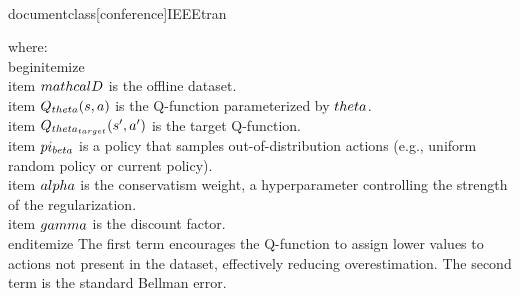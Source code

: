 \\documentclass[conference]{IEEEtran}
\begin{document}
where:
\\begin{itemize}
    \\item $\\mathcal{D}$ is the offline dataset.
    \\item $Q_{\\theta}(s,a)$ is the Q-function parameterized by $\\theta$.
    \\item $Q_{\\theta_{target}}(s',a')$ is the target Q-function.
    \\item $\\pi_{\\beta}$ is a policy that samples out-of-distribution actions (e.g., uniform random policy or current policy).
    \\item $\\alpha$ is the conservatism weight, a hyperparameter controlling the strength of the regularization.
    \\item $\\gamma$ is the discount factor.
\\end{itemize}
The first term encourages the Q-function to assign lower values to actions not present in the dataset, effectively reducing overestimation. The second term is the standard Bellman error.
\end{document}
